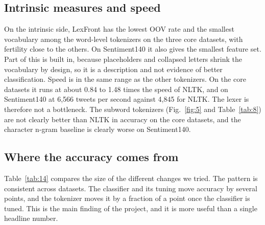 \documentclass[journal,onecolumn,12pt,a4paper]{IEEEtran}
\begin{document}
\subsection{Intrinsic measures and speed}\label{sec:5.4}
On the intrinsic side, LexFront has the lowest OOV rate and the smallest vocabulary among the word-level tokenizers on the three core datasets, with fertility close to the others. On Sentiment140 it also gives the smallest feature set. Part of this is built in, because placeholders and collapsed letters shrink the vocabulary by design, so it is a description and not evidence of better classification. Speed is in the same range as the other tokenizers. On the core datasets it runs at about 0.84 to 1.48 times the speed of NLTK, and on Sentiment140 at 6,566 tweets per second against 4,845 for NLTK. The lexer is therefore not a bottleneck. The subword tokenizers (Fig.~\ref{fig:5} and Table~\ref{tab:8}) are not clearly better than NLTK in accuracy on the core datasets, and the character n-gram baseline is clearly worse on Sentiment140.

\subsection{Where the accuracy comes from}\label{sec:5.5}
Table~\ref{tab:14} compares the size of the different changes we tried. The pattern is consistent across datasets. The classifier and its tuning move accuracy by several points, and the tokenizer moves it by a fraction of a point once the classifier is tuned. This is the main finding of the project, and it is more useful than a single headline number.
\end{document}
